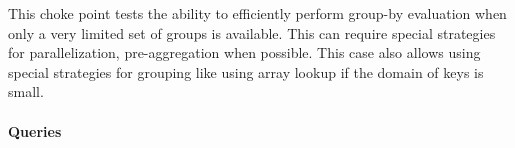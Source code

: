 
This choke point tests the ability to efficiently perform group-by evaluation
when only a very limited set of groups is available.  This can require special
strategies for parallelization, \eg pre-aggregation when possible. This case
also allows using special strategies for grouping like using array lookup if the
domain of keys is small.


\paragraph{Queries}
{\raggedright
}